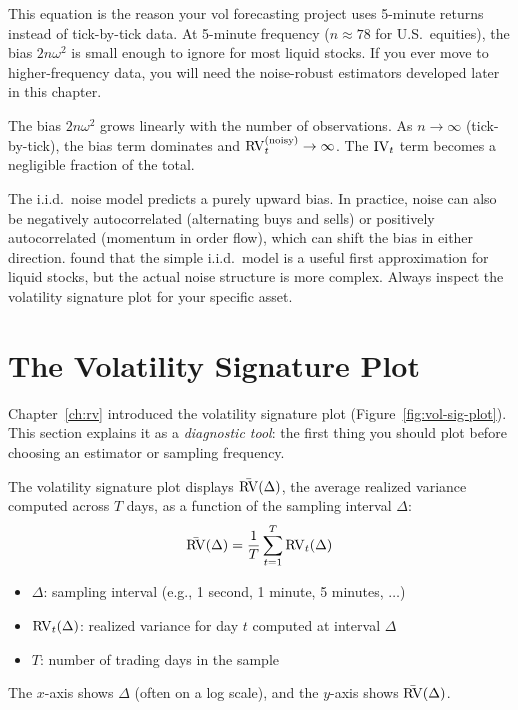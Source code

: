 \begin{projectconnection}
This equation is the reason your vol forecasting project uses 5-minute returns instead of tick-by-tick data.
At 5-minute frequency ($n \approx 78$ for U.S.\ equities), the bias $2n\omega^2$ is small enough to ignore for most liquid stocks.
If you ever move to higher-frequency data, you will need the noise-robust estimators developed later in this chapter.
\end{projectconnection}

The bias $2n\omega^2$ grows linearly with the number of observations.
As $n \to \infty$ (tick-by-tick), the bias term dominates and $\operatorname{RV}_t^{(\text{noisy})} \to \infty$.
The $\operatorname{IV}_t$ term becomes a negligible fraction of the total.

\begin{warning}
The i.i.d.\ noise model predicts a purely upward bias.
In practice, noise can also be negatively autocorrelated (alternating buys and sells) or positively autocorrelated (momentum in order flow), which can shift the bias in either direction.
\citet{HansenLunde2006} found that the simple i.i.d.\ model is a useful first approximation for liquid stocks, but the actual noise structure is more complex.
Always inspect the volatility signature plot for your specific asset.
\end{warning}


\section{The Volatility Signature Plot}
\label{sec:vol-sig-plot}

Chapter~\ref{ch:rv} introduced the volatility signature plot (Figure~\ref{fig:vol-sig-plot}).
This section explains it as a \emph{diagnostic tool}: the first thing you should plot before choosing an estimator or sampling frequency.

\begin{definition}
The volatility signature plot displays $\bar{\operatorname{RV}}(\Delta)$, the average realized variance computed across $T$ days, as a function of the sampling interval $\Delta$:
\[
  \bar{\operatorname{RV}}(\Delta) = \frac{1}{T} \sum_{t=1}^{T} \operatorname{RV}_t(\Delta)
\]
\begin{itemize}[nosep]
  \item $\Delta$: sampling interval (e.g., 1 second, 1 minute, 5 minutes, $\ldots$)
  \item $\operatorname{RV}_t(\Delta)$: realized variance for day $t$ computed at interval $\Delta$
  \item $T$: number of trading days in the sample
\end{itemize}
The $x$-axis shows $\Delta$ (often on a log scale), and the $y$-axis shows $\bar{\operatorname{RV}}(\Delta)$.
\end{definition}

